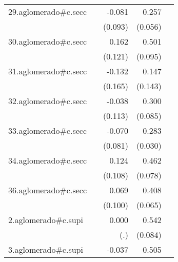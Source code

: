 {\begin{longtable}{l*{4}{D{.}{.}{-1}}}
\addlinespace
29.aglomerado#c.secc&                     &      -0.081         &       0.257\sym{***}&                     \\
            &                     &     (0.093)         &     (0.056)         &                     \\
\addlinespace
30.aglomerado#c.secc&                     &       0.162         &       0.501\sym{***}&                     \\
            &                     &     (0.121)         &     (0.095)         &                     \\
\addlinespace
31.aglomerado#c.secc&                     &      -0.132         &       0.147         &                     \\
            &                     &     (0.165)         &     (0.143)         &                     \\
\addlinespace
32.aglomerado#c.secc&                     &      -0.038         &       0.300\sym{***}&                     \\
            &                     &     (0.113)         &     (0.085)         &                     \\
\addlinespace
33.aglomerado#c.secc&                     &      -0.070         &       0.283\sym{***}&                     \\
            &                     &     (0.081)         &     (0.030)         &                     \\
\addlinespace
34.aglomerado#c.secc&                     &       0.124         &       0.462\sym{***}&                     \\
            &                     &     (0.108)         &     (0.078)         &                     \\
\addlinespace
36.aglomerado#c.secc&                     &       0.069         &       0.408\sym{***}&                     \\
            &                     &     (0.100)         &     (0.065)         &                     \\
\addlinespace
2.aglomerado#c.supi&                     &       0.000         &       0.542\sym{***}&                     \\
            &                     &         (.)         &     (0.084)         &                     \\
\addlinespace
3.aglomerado#c.supi&                     &      -0.037         &       0.505\sym{***}&                     \\

\end{longtable}}
